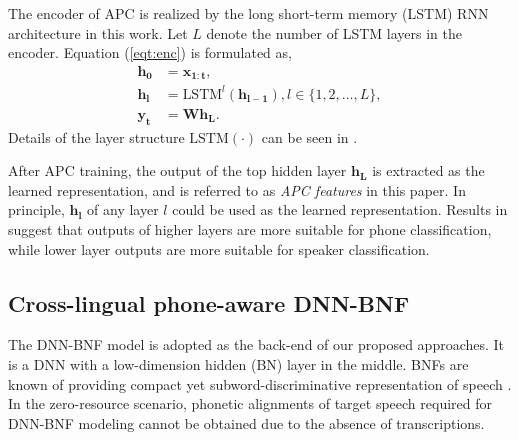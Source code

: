 \documentclass[a4paper]{article}
\begin{document}
The encoder of APC is realized by the long short-term memory (LSTM) \cite{hochreiter1997long} RNN architecture in this work. Let $L$ denote the number of LSTM layers in the encoder. Equation (\ref{eqt:enc}) is formulated as,
\begin{align}
    \bm{h_0} &= \bm{x_{1:t}},    \\
    \bm{h_l} &= \textrm{LSTM}^l (\bm{h_{l-1}}), l\in \{1,2,\ldots, L\}, \\
    \bm{y_t} &= \bm{W} \bm{h_L}.
\end{align}
Details of the  layer structure $\textrm{LSTM} (\cdot)$ can be seen in \cite{sak2014long}.

After APC training, the output of the top hidden layer $\bm{h_L}$ is extracted as the  learned  representation, and is referred to as \textit{APC features} in this paper. In principle,  $\bm{h_l}$ of any layer $l$ could be used as the learned representation. Results in \cite{Chung2019} suggest that outputs of higher layers  are more suitable for phone classification, while lower layer outputs are  more suitable for speaker classification.

\subsection{Cross-lingual phone-aware DNN-BNF}
The DNN-BNF model  \cite{chen2017multilingual,feng2018exploiting} is adopted as the back-end of our proposed approaches. It is a DNN with a low-dimension hidden (BN) layer in the middle. BNFs are known of providing compact yet subword-discriminative representation of speech \cite{grezl2009investigation}.  
In the zero-resource scenario, phonetic alignments of target speech required for DNN-BNF modeling cannot be obtained due to the absence of transcriptions. 
\end{document}
